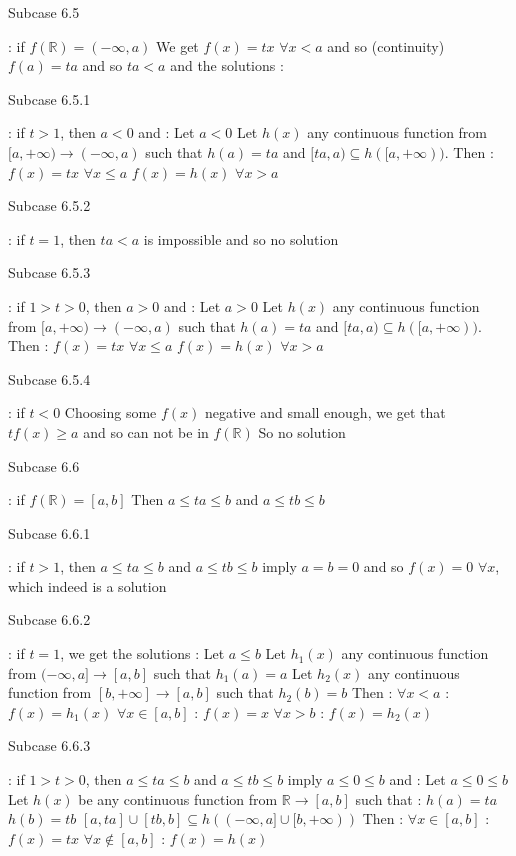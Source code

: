 \begin{solution}
\begin{bolded}Subcase 6.5\end{bolded} : if $f(\mathbb R)=(-\infty,a)$
We get $f(x)=tx$ $\forall x<a$ and so (continuity) $f(a)=ta$ and so $ta<a$ and the solutions :

\begin{bolded}Subcase 6.5.1\end{bolded}: if $t>1$, then $a< 0$ and :
Let $a<0$ 
Let $h(x)$ any continuous function from $[a,+\infty)\to(-\infty,a)$ such that $h(a)=ta$ and $[ta,a)\subseteq h([a,+\infty))$. Then :
$f(x)=tx$ $\forall x\le a$
$f(x)=h(x)$ $\forall x>a$

\begin{bolded}Subcase 6.5.2\end{bolded}: if $t=1$, then $ta<a$ is impossible and so no solution

\begin{bolded}Subcase 6.5.3\end{bolded} : if $1>t>0$, then $a>0$ and :
Let $a>0$ 
Let $h(x)$ any continuous function from $[a,+\infty)\to(-\infty,a)$ such that $h(a)=ta$ and $[ta,a)\subseteq h([a,+\infty))$. Then :
$f(x)=tx$ $\forall x\le a$
$f(x)=h(x)$ $\forall x>a$

\begin{bolded}Subcase 6.5.4\end{bolded} : if $t<0$
Choosing some $f(x)$ negative and small enough, we get that $tf(x)\ge a$ and so can not be in $f(\mathbb R)$
So no solution

\begin{bolded}Subcase 6.6 \end{bolded}: if $f(\mathbb R)=[a,b]$
Then $a\le ta\le b$ and $a\le tb\le b$

\begin{bolded}Subcase 6.6.1\end{bolded} : if $t>1$, then $a\le ta\le b$ and $a\le tb\le b$ imply $a=b=0$ and so $f(x)=0$ $\forall x$, which indeed is a solution

\begin{bolded}Subcase 6.6.2\end{bolded} : if $t=1$, we get the solutions :
Let $a\le b$
Let $h_1(x)$ any continuous function from $(-\infty,a]\to[a,b]$ such that $h_1(a)=a$
Let $h_2(x)$ any continuous function from $[b,+\infty]\to[a,b]$ such that $h_2(b)=b$
Then :
$\forall x<a$ : $f(x)=h_1(x)$
$\forall x\in[a,b]$ : $f(x)=x$
$\forall x>b$ : $f(x)=h_2(x)$

\begin{bolded}Subcase 6.6.3\end{bolded} : if $1>t>0$, then $a\le ta\le b$ and $a\le tb\le b$ imply $a\le 0\le b$ and :
Let $a\le 0\le b$
Let $h(x)$ be any continuous function from $\mathbb R\to[a,b]$ such that :
$h(a)=ta$
$h(b)=tb$
$[a,ta]\cup[tb,b]\subseteq h((-\infty,a]\cup[b,+\infty))$
Then :
$\forall x\in[a,b]$ : $f(x)=tx$
$\forall x\notin[a,b]$ : $f(x)=h(x)$


\end{solution}
